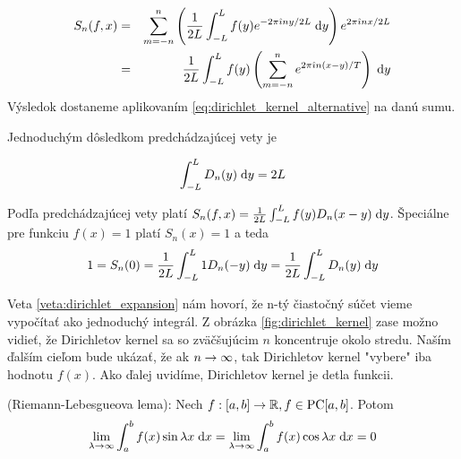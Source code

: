 \begin{dokaz}
    \begin{eqnarray}
        S_n(f,x) &=& \sum_{m=-n}^{n} \left(
            \frac{1}{2L} \int_{-L}^{L} f(y) e^{-2\pi\hat{\imath} n y/2L} \; \mathrm{d} y
            \right) 
                e^{2\pi\hat{\imath} n x/2L} \\
            &=& \frac{1}{2L} \int_{-L}^{L} f(y) \left(
                    \sum_{m=-n}^{n} e^{2\pi\hat{\imath} n (x-y)/T}
                \right) \; \mathrm{d} y \\
    \end{eqnarray}
    Výsledok dostaneme aplikovaním
    \ref{eq:dirichlet_kernel_alternative} na danú sumu.
\end{dokaz}

Jednoduchým dôsledkom predchádzajúcej vety je
\begin{lema}
    \begin{equation}
        \int_{-L}^{L} D_n(y) \; \mathrm{d} y = 2L
    \end{equation}
\end{lema}
\begin{dokaz}
    Podľa predchádzajúcej vety platí 
    $S_n(f,x) = \frac{1}{2L} \int_{-L}^{L} f(y) D_n(x-y) \; \mathrm{d} y$.
    Špeciálne pre funkciu $f(x)=1$ platí $S_n(x)=1$ a teda
    \begin{equation}
        1=S_n(0) = \frac{1}{2L} \int_{-L}^{L} 1 D_n(-y) \; \mathrm{d} y =
            \frac{1}{2L} \int_{-L}^{L} D_n(y) \; \mathrm{d} y
    \end{equation}
    \label{lema:dirichlet_kernel_integration}
\end{dokaz}

Veta \ref{veta:dirichlet_expansion} nám hovorí, že n-tý čiastočný
súčet vieme vypočítať ako jednoduchý  integrál.
Z obrázka \ref{fig:dirichlet_kernel} zase možno vidieť, že
Dirichletov kernel sa so zväčšujúcim $n$ koncentruje okolo stredu.
Naším ďalším cieľom bude ukázať, že ak $n\rightarrow \infty$, tak
Dirichletov kernel "vybere" iba hodnotu $f(x)$. 
Ako ďalej uvidíme, Dirichletov kernel je 
detla funkcii.

\begin{lema}
    (Riemann-Lebesgueova lema):
    Nech $f: [a,b]\rightarrow {\mathbb R}, f\in \mbox{PC}[a,b]$. Potom
    \begin{equation}
        \lim_{\lambda\rightarrow\infty} \int_a^b f(x) \sin \lambda x \; \mathrm{d} x=
        \lim_{\lambda\rightarrow\infty} \int_a^b f(x) \cos \lambda x \; \mathrm{d} x=
        0
    \end{equation}
\end{lema}

